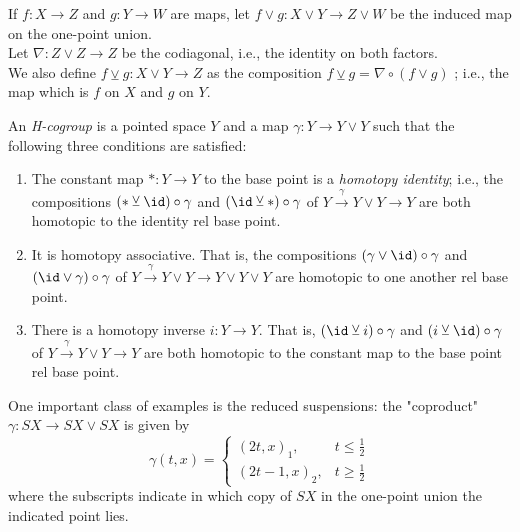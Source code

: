 \begin{definition}
    If $f \colon X \to Z$ and
    $g \colon Y \to W$ are maps, let
    $f \vee g \colon X \vee Y \to Z \vee W$ be the
    induced map on the one-point union.\\
    Let $\nabla \colon Z \vee Z \to Z$ be the
    codiagonal, i.e., the identity on
    both factors.\\
    We also define
    $f \veebar g \colon X \vee Y \to Z$ as
    the composition $f \veebar g =
    \nabla \circ \left( f \vee g \right) $ ; i.e., the
    map which is $f$ on $X$ and $g$ on $Y$.
\end{definition}

\begin{definition}[H-cogroup]
    An \textit{H-cogroup} is a pointed space $Y$ and
    a map $\gamma \colon Y \to Y \vee Y$ such that
    the following three conditions are satisfied:
    \begin{enumerate}
        \item The constant map $* \colon Y \to Y$ to the
            base point is a \textit{homotopy identity}; i.e.,
            the compositions
            $\left( * \veebar \id \right) \circ \gamma$ and
            $\left( \id \veebar * \right) \circ \gamma$ of
            $Y \stackrel{\gamma}{\to} Y \vee Y \to Y$ 
            are both homotopic to the identity rel base
            point.
        \item It is homotopy associative. That is, the compositions
            $\left( \gamma \vee \id \right) \circ \gamma$
            and $\left( \id \vee \gamma \right) \circ \gamma$ 
            of $Y \stackrel{\gamma}{\to} Y \vee Y
            \to Y \vee Y \vee Y$ are homotopic to one another
            rel base point.
        \item There is a homotopy inverse $i \colon Y \to Y$.
            That is, $\left( \id \veebar i \right) \circ \gamma$ 
            and $\left( i \veebar \id \right) \circ \gamma$
            of $Y \stackrel{\gamma}{\to} Y \vee Y \to Y$ 
            are both homotopic to the constant map to the
            base point rel base point.
    \end{enumerate}
\end{definition}

One important class of examples is the
reduced suspensions: the
"coproduct" $\gamma \colon SX \to SX \vee SX$ is given by
\[
\gamma (t,x) = 
\begin{cases}
    \left( 2t,x \right)_{1},& t \le \frac{1}{2}\\
    \left( 2t-1,x \right)_{2},& t\ge \frac{1}{2}
\end{cases}
\] 
where the subscripts indicate in which copy
of $SX$ in the one-point union the indicated point lies.

